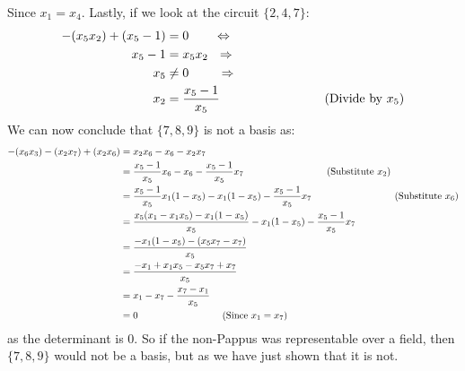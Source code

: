 \documentclass[a4paper, fleqn]{article}
\newcommand{\comment}[1]{%
  \text{\phantom{(#1)}} \tag{#1}}
\begin{document}
Since $x_1=x_4$. Lastly, if we look at the circuit $\{2,4,7\}$:
\begin{align*}
  -(x_5x_2)+(x_5-1)&=0 \ \ \ \ \ \ \Leftrightarrow \\
  x_5-1&=x_5x_2 \ \ \Rightarrow \\
  x_5&\neq 0 \ \ \ \ \ \ \ \Rightarrow \\
  x_2&=\frac{x_5-1}{x_5} \comment{Divide by $x_5$}
\end{align*}
We can now conclude that $\{7,8,9\}$ is not a basis as:
\begin{align*}
  -(x_6x_3)-(x_2x_7)+(x_2x_6) &= x_2x_6-x_6-x_2x_7 \\
                              &= \frac{x_5-1}{x_5}x_6-x_6-\frac{x_5-1}{x_5}x_7
  \comment{Substitute $x_2$} \\
  &= \frac{x_5-1}{x_5}x_1(1-x_5)-x_1(1-x_5)-\frac{x_5-1}{x_5}x_7
  \comment{Substitute $x_6$} \\
  &=\frac{x_5(x_1-x_1x_5)-x_1(1-x_5)}{x_5}-x_1(1-x_5)-\frac{x_5-1}{x_5}x_7 \\
  &=\frac{-x_1(1-x_5)-(x_5x_7-x_7)}{x_5} \\
  &=\frac{-x_1+x_1x_5-x_5x_7+x_7}{x_5} \\
  &=x_1-x_7-\frac{x_7-x_1}{x_5} \\
  &= 0 \comment{Since $x_1=x_7$}
\end{align*}
as the determinant is $0$. So if the non-Pappus was representable over a field, then
$\{7,8,9\}$ would not be a basis, but as we have just shown that it is not.
\end{document}
